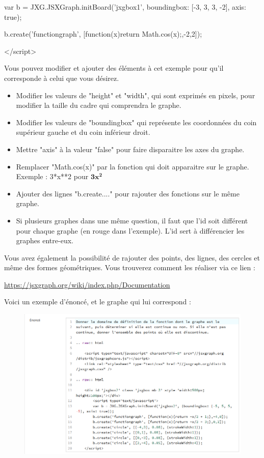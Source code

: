 \documentclass{article}
\begin{document}
\hspace{2cm}var b = JXG.JSXGraph.initBoard({\color{red}'jxgbox1'}, {boundingbox: [-3, 3, 3, -2], axis: true});

\hspace{2cm}b.create('functiongraph', [function(x){return Math.cos(x);},-2,2]);

\hspace{1cm}</script>
\bigskip

Vous pouvez modifier et ajouter des éléments à cet exemple pour qu'il corresponde à celui que vous désirez.

\begin{itemize}
    \item Modifier les valeurs de "height" et "width", qui sont exprimés en pixels, pour modifier la taille du cadre qui comprendra le graphe.
    \item Modifier les valeurs de "boundingbox" qui représente les coordonnées du coin supérieur gauche et du coin inférieur droit.
    \item Mettre "axis" à la valeur "false" pour faire disparaitre les axes du graphe.
    \item Remplacer "Math.cos(x)" par la fonction qui doit apparaitre sur le graphe. Exemple : 3*x**2 pour $\mathbf{3x^2}$
    \item Ajouter des lignes "b.create...." pour rajouter des fonctions sur le même graphe.
    \item Si plusieurs graphes dans une même question, il faut que l'id soit différent pour chaque graphe (en rouge dans l'exemple). L'id sert à différencier les graphes entre-eux.
\end{itemize}
\bigskip

Vous avez également la possibilité de rajouter des points, des lignes, des cercles et même des formes géométriques. Vous trouverez comment les réaliser via ce lien :
\bigskip

\url{https://jsxgraph.org/wiki/index.php/Documentation}

\bigskip

Voici un exemple d'énoncé, et le graphe qui lui correspond :

\begin{figure}[!htb]
    \centering
    \includegraphics[scale=0.6]{images/fonc.png}
\end{figure}
\end{document}
